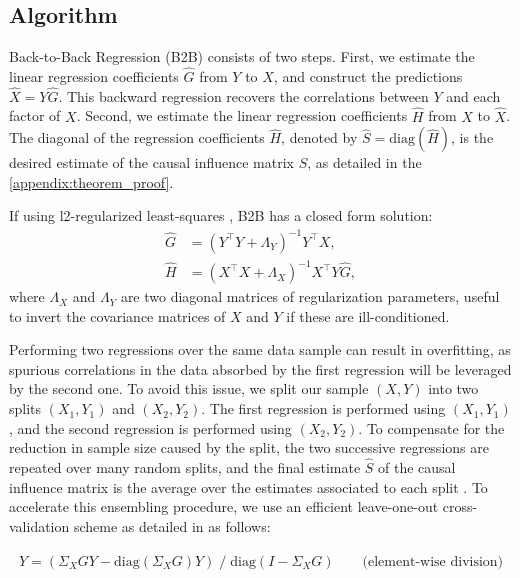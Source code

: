 \documentclass[preprint,12pt,3p]{elsarticle}
\begin{document}
\subsection{Algorithm}

Back-to-Back Regression (B2B) consists of two steps.
%
First, we estimate the linear regression coefficients $\hat G$ from $Y$ to $X$,
and construct the predictions $\hat X = Y \hat G$.
%
This backward regression recovers the correlations between $Y$ and each factor
of $X$.
%
Second, we estimate the linear regression coefficients $\hat H$ from $X$ to
$\hat X$.
%
The diagonal of the regression coefficients $\hat H$, denoted by $\hat{S} =
\text{diag}(\hat{H})$, is the desired estimate of the causal influence matrix
$S$, as detailed in the \ref{appendix:theorem_proof}.

If using l2-regularized least-squares \citep{hoerl1959optimum, rifkin2007notes},
B2B has a closed form solution:
\begin{align}
    \hat G &= (Y^\top Y + \Lambda_Y)^{-1} Y^\top X,\label{eq:solG}\\
    \hat H &=(X^\top X + \Lambda_X)^{-1} X^\top Y \hat G,\label{eq:solH}
\end{align}
%
where $\Lambda_X$ and $\Lambda_Y$ are two diagonal matrices of regularization
parameters, useful to invert the covariance matrices of $X$ and $Y$ if these are
ill-conditioned.

Performing two regressions over the same data sample can result in overfitting,
as spurious correlations in the data absorbed by the first regression will be
leveraged by the second one.
%
To avoid this issue, we split our sample $(X, Y)$ into two splits $(X_1, Y_1)$
and $(X_2, Y_2)$.
%
The first regression is performed using $(X_1, Y_1)$, and the second
regression is performed using $(X_2, Y_2)$.
%
To compensate for the reduction in sample size caused by the split, the two
successive regressions are
repeated over many random splits, and the final estimate $\hat S$ of the causal
influence matrix is the average over the estimates associated to each split
\citep{breiman1996bagging}.
%
To accelerate this ensembling procedure, we use an efficient
leave-one-out cross-validation scheme as detailed in \citep{rifkin2007notes}
as follows:
%

\begin{equation}
\hat{Y} = (\Sigma_X G Y - \text{diag}(\Sigma_X G) Y) \;/\; \text{diag}(I - \Sigma_X G) \qquad \text{(element-wise division)}
\end{equation}
\end{document}
